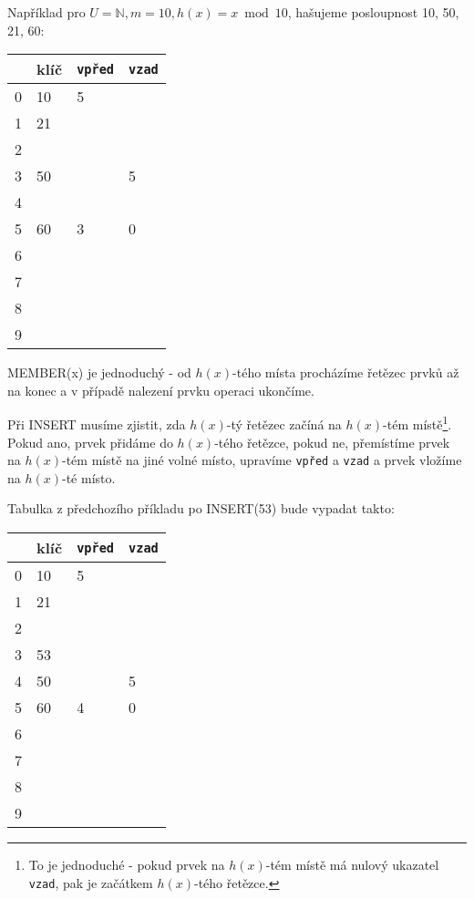 \begin{samepage}
\begin{priklad}
Například pro $U=\mathbb{N}, m=10, h(x) = x \bmod 10$, hašujeme posloupnost
10, 50, 21, 60: 

\vspace{5mm}
\begin{tabular}{|l|l|l|l|}
\hline
& klíč& {\tt vpřed}& {\tt vzad}\\
\hline
0& 10& 5& \\
1& 21& & \\
2& & & \\
3& 50& & 5\\
4& & & \\
5& 60& 3& 0\\
6& & & \\
7& & & \\
8& & & \\
9& & & \\
\hline
\end{tabular}
\end{priklad}
\end{samepage}
\vspace{5mm}

MEMBER(x) je jednoduchý - od $h(x)$-tého místa procházíme řetězec prvků až
na konec a v případě nalezení prvku operaci ukončíme.

Při INSERT musíme zjistit, zda $h(x)$-tý řetězec začíná na $h(x)$-tém
místě\footnote{To je jednoduché - pokud prvek na $h(x)$-tém místě má
nulový ukazatel {\tt vzad}, pak je začátkem $h(x)$-tého řetězce.}.
Pokud ano, prvek přidáme do $h(x)$-tého řetězce,
pokud ne, přemístíme prvek na $h(x)$-tém místě na jiné volné místo,
upravíme {\tt vpřed} a {\tt vzad} a prvek vložíme na $h(x)$-té místo.

\pagebreak

\begin{samepage}
\begin{priklad}
Tabulka z předchozího příkladu po INSERT(53) bude vypadat takto: 

\vspace{5mm}
\begin{tabular}{|l|l|l|l|}
\hline
& klíč& {\tt vpřed}& {\tt vzad}\\
\hline
0& 10& 5& \\
1& 21& & \\
2& & & \\
3& 53& & \\
4& 50& & 5\\
5& 60& 4& 0\\
6& & & \\
7& & & \\
8& & & \\
9& & & \\
\hline
\end{tabular}
\end{priklad}
\end{samepage}
\vspace{5mm}

